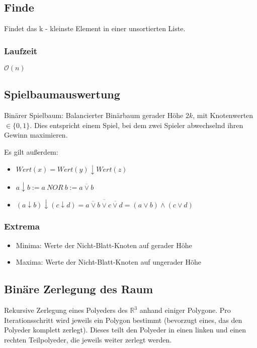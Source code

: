 \subsection{Finde}
Findet das k - kleinste Element in einer unsortierten Liste.\\


\subsubsection{Laufzeit}
\(\mathcal{O}(n)\)

\subsection{Spielbaumauswertung}
Binärer Spielbaum: Balancierter Binärbaum gerader Höhe \(2k\), mit Knotenwerten \(\in \{0,1\}\). Dies entspricht einem Spiel, bei dem zwei Spieler abwechselnd ihren Gewinn maximieren.

Es gilt außerdem:
\begin{itemize}
	\item \(Wert(x) = Wert(y) \downarrow Wert(z)\)
	\item \(a \downarrow b := a~NOR~b := \overline{a \vee b}\)
	\item \((a \downarrow b) \downarrow (c \downarrow d) = \overline{\overline{a \vee b} \vee \overline{c \vee d}} = (a \vee b) \wedge (c \vee d)\)
\end{itemize}

\subsubsection{Extrema}
\begin{itemize}
	\item Minima: Werte der Nicht-Blatt-Knoten auf gerader Höhe
	\item Maxima: Werte der Nicht-Blatt-Knoten auf ungerader Höhe
\end{itemize}




\subsection{Binäre Zerlegung des Raum}
Rekursive Zerlegung eines Polyeders des \(\mathbb{R}^3\) anhand einiger Polygone. Pro Iterationsschritt wird jeweils ein Polygon bestimmt (bevorzugt eines, das den Polyeder komplett zerlegt). Dieses teilt den Polyeder in einen linken und einen rechten Teilpolyeder, die jeweils weiter zerlegt werden.



